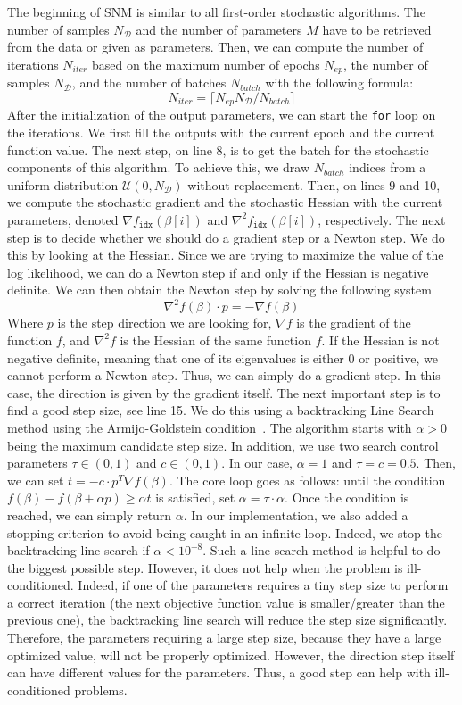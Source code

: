 \documentclass[conference]{IEEEtran}
\begin{document}
The beginning of SNM is similar to all first-order stochastic algorithms. The number of samples $N_{\mathcal{D}}$ and the number of parameters $M$ have to be retrieved from the data or given as parameters. Then, we can compute the number of iterations $N_{iter}$ based on the maximum number of epochs $N_{ep}$, the number of samples $N_{\mathcal{D}}$, and the number of batches $N_{batch}$ with the following formula:
\[
N_{iter} = \lceil N_{ep}N_{\mathcal{D}}/N_{batch} \rceil
\]
After the initialization of the output parameters, we can start the \texttt{for} loop on the iterations. We first fill the outputs with the current epoch and the current function value. The next step, on line 8, is to get the batch for the stochastic components of this algorithm. To achieve this, we draw $N_{batch}$ indices from a uniform distribution $\mathcal{U}(0, N_{\mathcal{D}})$ without replacement. Then, on lines 9 and 10, we compute the stochastic gradient and the stochastic Hessian with the current parameters, denoted $\nabla f_{\texttt{idx}}(\beta[i])$ and $\nabla^2 f_{\texttt{idx}}(\beta[i])$, respectively. The next step is to decide whether we should do a gradient step or a Newton step. We do this by looking at the Hessian. Since we are trying to maximize the value of the log likelihood, we can do a Newton step if and only if the Hessian is negative definite. We can then obtain the Newton step by solving the following system
\[
\nabla^2 f(\beta) \cdot p = - \nabla f(\beta)
\]
Where $p$ is the step direction we are looking for, $\nabla f$ is the gradient of the function $f$, and $\nabla^2 f$ is the Hessian of the same function $f$. If the Hessian is not negative definite, meaning that one of its eigenvalues is either 0 or positive, we cannot perform a Newton step. Thus, we can simply do a gradient step. In this case, the direction is given by the gradient itself. The next important step is to find a good step size, see line 15. We do this using a backtracking Line Search method using the Armijo-Goldstein condition~\cite{armijo_minimization_1966}. The algorithm starts with $\alpha>0$ being the maximum candidate step size. In addition, we use two search control parameters $\tau\in(0,1)$ and $c\in(0,1)$. In our case, $\alpha=1$ and $\tau=c=0.5$. Then, we can set $t = -c\cdot p^T\nabla f(\beta)$. The core loop goes as follows: until the condition $f(\beta) - f(\beta + \alpha p) \geq \alpha t$ is satisfied, set $\alpha = \tau \cdot \alpha$. Once the condition is reached, we can simply return $\alpha$. In our implementation, we also added a stopping criterion to avoid being caught in an infinite loop. Indeed, we stop the backtracking line search if $\alpha < 10^{-8}$. Such a line search method is helpful to do the biggest possible step. However, it does not help when the problem is ill-conditioned. Indeed, if one of the parameters requires a tiny step size to perform a correct iteration (the next objective function value is smaller/greater than the previous one), the backtracking line search will reduce the step size significantly. Therefore, the parameters requiring a large step size, because they have a large optimized value, will not be properly optimized. However, the direction step itself can have different values for the parameters. Thus, a good step can help with ill-conditioned problems.
\end{document}
